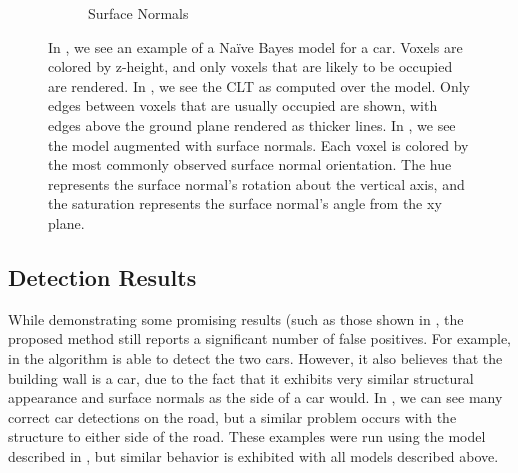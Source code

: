 \begin{figure}
\begin{subfigure}[]{0.3\linewidth}
    \caption{Surface Normals}
    \label{fig:sn}
  \end{subfigure}
  \caption{In , we see an example of a Na\"ive Bayes model for a
    car. Voxels are colored by z-height, and only voxels that are likely to be
    occupied are rendered. In , we see the \ac{CLT} as computed
    over the model. Only edges between voxels that are usually occupied are
    shown, with edges above the ground plane rendered as thicker lines. In
    , we see the model augmented with surface normals. Each voxel
    is colored by the most commonly observed surface normal orientation. The hue
    represents the surface normal's rotation about the vertical axis, and the
    saturation represents the surface normal's angle from the xy plane.}
  \label{fig:models}
\end{figure}

\subsection{Detection Results}

While demonstrating some promising results (such as those shown in
, the proposed method still reports a significant number
of false positives. For example, in  the algorithm is able to
detect the two cars. However, it also believes that the building wall is a car,
due to the fact that it exhibits very similar structural appearance and surface
normals as the side of a car would. In , we can see many correct
car detections on the road, but a similar problem occurs with the structure to
either side of the road. These examples were run using the model described in
, but similar behavior is exhibited with all models
described above.

